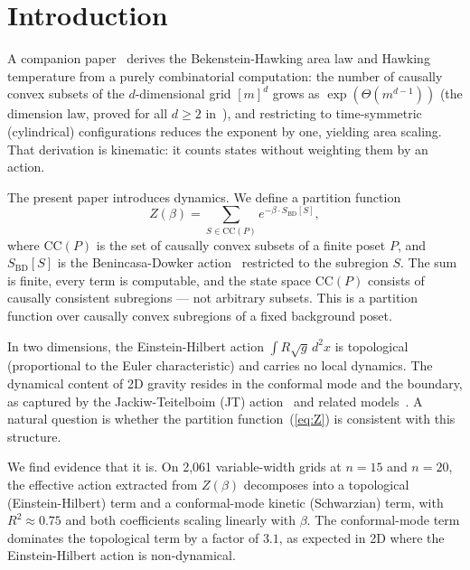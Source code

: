 \documentclass[aps,prd,twocolumn,superscriptaddress]{revtex4-2}
\begin{document}
\maketitle

\section{Introduction}

A companion paper~\cite{DiFioreBH} derives the Bekenstein-Hawking
area law and Hawking temperature from a purely combinatorial
computation: the number of causally convex subsets of the
$d$-dimensional grid $[m]^d$ grows as $\exp(\Theta(m^{d-1}))$
(the dimension law, proved for all $d \geq 2$
in~\cite{DiFioreGrid}), and restricting to time-symmetric
(cylindrical) configurations reduces the exponent by one, yielding
area scaling. That derivation is kinematic: it counts states without
weighting them by an action.

The present paper introduces dynamics. We define a partition function
\begin{equation}
\label{eq:Z}
Z(\beta) = \sum_{S \in \mathrm{CC}(P)} e^{-\beta \cdot S_{\mathrm{BD}}[S]},
\end{equation}
where $\mathrm{CC}(P)$ is the set of causally convex subsets of a
finite poset $P$, and $S_{\mathrm{BD}}[S]$ is the Benincasa-Dowker
action~\cite{BenincasaDowker} restricted to the subregion $S$.
The sum is finite, every term is computable, and the state space
$\mathrm{CC}(P)$ consists of causally consistent subregions --- not
arbitrary subsets. This is a partition function over causally convex subregions of a fixed background poset.

In two dimensions, the Einstein-Hilbert action $\int R \sqrt{g}\,
d^2x$ is topological (proportional to the Euler characteristic) and
carries no local dynamics. The dynamical content of 2D gravity
resides in the conformal mode and the boundary, as captured by the
Jackiw-Teitelboim (JT) action~\cite{Jackiw1985,Teitelboim1983}
and related models~\cite{Saad2019}. A natural
question is whether the partition function~(\ref{eq:Z}) is consistent
with this structure.

We find evidence that it is. On 2{,}061 variable-width grids at
$n = 15$ and $n = 20$, the effective action extracted from $Z(\beta)$ decomposes
into a topological (Einstein-Hilbert) term and a conformal-mode
kinetic (Schwarzian) term, with $R^2 \approx 0.75$ and both coefficients
scaling linearly with $\beta$. The conformal-mode term dominates the
topological term by a factor of $3.1$, as expected in 2D where the
Einstein-Hilbert action is non-dynamical.
\end{document}
